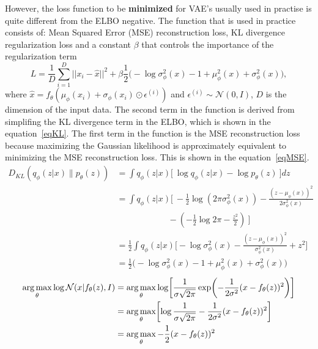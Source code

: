 However, the loss function to be \textbf{minimized} for VAE's usually used in practise is quite different from the ELBO negative. 
The function that is used in practice consists of: Mean Squared Error (MSE) reconstruction loss, KL divergence regularization loss and a constant $\beta$ that controls the importance of the regularization term
\[ L = \frac{1}{D} \sum_{i=1}^{D} ||x_i - \hat{x} ||^2 + \beta  \frac{1}{2} \biggl( -\log \sigma^2_\phi(x) - 1 + \mu^2_\phi(x) + \sigma^2_\phi(x) \biggr), \]
where $\hat{x} = f_{\theta}(\mu_{\phi}(x_i) + \sigma_{\phi}(x_i) \odot \epsilon^{(i)})$ and $\epsilon^{(i)} \sim \mathcal{N}(0, I)$, $D$ is the dimension of the input data. The second term in the function is derived from simplifing the KL divergence term in the ELBO, which is shown in the equation~\ref{eqKL}. The first term in the function is the MSE reconstruction loss because maximizing the Gaussian likelihood is approximately equivalent to minimizing the MSE reconstruction loss. This is shown in the equation~\ref{eqMSE}.
\begin{equation} \label{eqKL}
    \begin{split}
        D_{KL}(q_\phi(z|x) \| p_\theta(z)) &= \int q_\phi(z|x) \biggl[\ \log q_\phi(z|x) - \log p_\theta(z) \ \biggr] dz \\
        &= \int q_\phi(z|x) \biggl[\ -\frac{1}{2} \log (2\pi\sigma^2_\phi(x)) - \frac{(z - \mu_\phi(x))^2}{2\sigma^2_\phi(x)} \\
        &\qquad\qquad\qquad - \left( -\frac{1}{2} \log 2\pi - \frac{z^2}{2} \right) \ \biggr] \\
        &= \frac{1}{2} \int q_\phi(z|x) \biggl[ -\log \sigma^2_\phi(x) - \frac{(z - \mu_\phi(x))^2}{\sigma^2_\phi(x)} + z^2 \biggr] \\
        &= \frac{1}{2} \biggl( -\log \sigma^2_\phi(x) - 1 + \mu^2_\phi(x) + \sigma^2_\phi(x) \biggr)
    \end{split}
\end{equation}
\begin{equation} \label{eqMSE}
    \begin{split}
        \operatorname*{arg\,max}_{\theta} \log \mathcal{N}(x|f_{\theta}(z), I) & = \operatorname*{arg\,max}_{\theta} \log \biggl[\frac{1}{\sigma \sqrt{2\pi}} \exp \biggl( -\frac{1}{2 \sigma^2} (x - f_{\theta}(z))^2 \biggr)\biggr] \\
        & = \operatorname*{arg\,max}_{\theta} \biggl[ \log \frac{1}{\sigma \sqrt{2\pi}} - \frac{1}{2 \sigma^2} (x - f_{\theta}(z))^2 \biggl]\\
        & = \operatorname*{arg\,max}_{\theta} -\frac{1}{2} (x - f_{\theta}(z))^2
    \end{split}
\end{equation}

